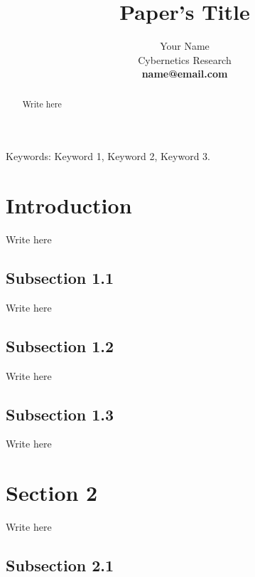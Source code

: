\documentclass[10pt,twocolumn,letterpaper]{article}
\begin{document}
\title{Paper's Title}

\author{Your Name\\
Cybernetics Research\\
{\bf \small name@email.com}
}


\maketitle



\begin{abstract}

Write here


\end{abstract}

\noindent Keywords: Keyword 1, Keyword 2, Keyword 3.


\section[do not write in this area]{Introduction}

Write here

\subsection{Subsection 1.1}

Write here

\subsection{Subsection 1.2}


Write here

\subsection{Subsection 1.3}

Write here






\section[do not write in this area]{Section 2}

Write here



\subsection{Subsection 2.1}
\end{document}
